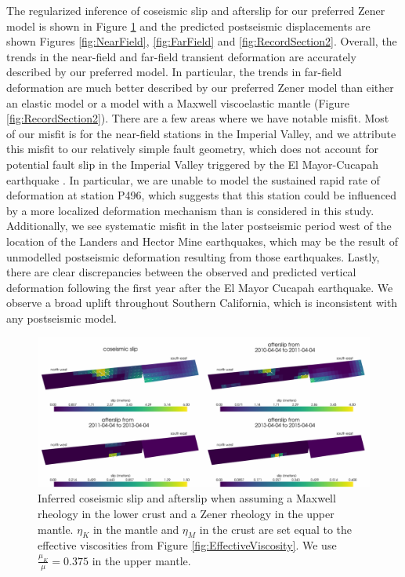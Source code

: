 \documentclass[review]{elsarticle}
\begin{document}
The regularized inference of coseismic slip and afterslip for our preferred Zener model is shown in Figure \ref{fig:FinalSlip} and the predicted postseismic displacements are shown Figures \ref{fig:NearField}, \ref{fig:FarField} and \ref{fig:RecordSection2}.  Overall, the trends in the near-field and far-field transient deformation are accurately described by our preferred model.  In particular, the trends in far-field deformation are much better described by our preferred Zener model than either an elastic model or a model with a Maxwell viscoelastic mantle (Figure \ref{fig:RecordSection2}).  There are a few areas where we have notable misfit.  Most of our misfit is for the near-field stations in the Imperial Valley, and we attribute this misfit to our relatively simple fault geometry, which does not account for potential fault slip in the Imperial Valley triggered by the El Mayor-Cucapah earthquake \citep{Wei2011a,Wei2015}. In particular, we are unable to model the sustained rapid rate of deformation at station P496, which suggests that this station could be influenced by a more localized deformation mechanism than is considered in this study.
Additionally, we see systematic misfit in the later postseismic period west of the location of the Landers and Hector Mine earthquakes, which may be the result of unmodelled postseismic deformation resulting from those earthquakes.  Lastly, there are clear discrepancies between the observed and predicted vertical deformation following the first year after the El Mayor Cucapah earthquake. We observe a broad uplift throughout Southern California, which is inconsistent with any postseismic model.

\begin{figure}
\includegraphics[scale=0.8]{Figures/FinalSlip}
\centering 
\caption{Inferred coseismic slip and afterslip when assuming a Maxwell rheology in the lower crust and a Zener rheology in the upper mantle.  $\eta_K$ in the mantle and $\eta_M$ in the crust are set equal to the effective viscosities from Figure \ref{fig:EffectiveViscosity}. We use $\frac{\mu_K}{\mu}=0.375$ in the upper mantle.}
\label{fig:FinalSlip}
\end{figure}
\end{document}
